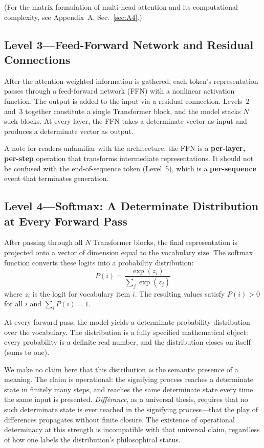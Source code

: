 \documentclass[a4paper,twocolumn,11pt]{article}
\begin{document}
(For the matrix formulation of multi-head attention and its computational complexity, see Appendix~A, Sec.~\ref{sec:A4}.)

\subsection{Level 3---Feed-Forward Network and Residual Connections}
\label{sec:ffn}

After the attention-weighted information is gathered, each token's representation passes through a feed-forward network (FFN) with a nonlinear activation function. The output is added to the input via a residual connection. Levels~2 and~3 together constitute a single Transformer block, and the model stacks $N$ such blocks. At every layer, the FFN takes a determinate vector as input and produces a determinate vector as output.

A note for readers unfamiliar with the architecture: the FFN is a \textbf{per-layer, per-step} operation that transforms intermediate representations. It should not be confused with the end-of-sequence token (Level~5), which is a \textbf{per-sequence} event that terminates generation.

\subsection{Level 4---Softmax: A Determinate Distribution at Every Forward Pass}
\label{sec:softmax}

After passing through all $N$ Transformer blocks, the final representation is projected onto a vector of dimension equal to the vocabulary size. The softmax function converts these logits into a probability distribution:
\begin{equation}
P(i) = \frac{\exp(z_i)}{\sum_{j} \exp(z_j)}
\end{equation}
where $z_i$ is the logit for vocabulary item $i$. The resulting values satisfy $P(i) > 0$ for all $i$ and $\sum_i P(i) = 1$.

At every forward pass, the model yields a determinate probability distribution over the vocabulary. The distribution is a fully specified mathematical object: every probability is a definite real number, and the distribution closes on itself (sums to one).

We make no claim here that this distribution \emph{is} the semantic presence of a meaning. The claim is operational: the signifying process reaches a determinate state in finitely many steps, and reaches the same determinate state every time the same input is presented. \emph{Diff\'erance}, as a universal thesis, requires that no such determinate state is ever reached in the signifying process---that the play of differences propagates without finite closure. The existence of operational determinacy at this strength is incompatible with that universal claim, regardless of how one labels the distribution's philosophical status.
\end{document}
